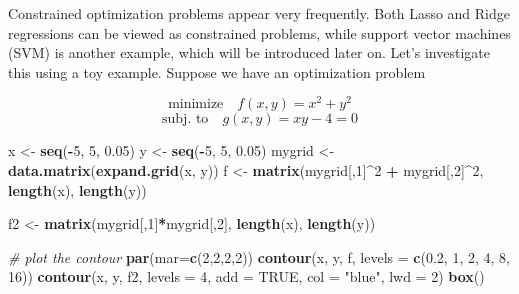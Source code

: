 \documentclass[
]{book}
\newenvironment{Shaded}{\begin{snugshade}}{\end{snugshade}}
\newcommand{\AttributeTok}[1]{\textcolor[rgb]{0.13,0.29,0.53}{#1}}
\newcommand{\CommentTok}[1]{\textcolor[rgb]{0.56,0.35,0.01}{\textit{#1}}}
\newcommand{\ConstantTok}[1]{\textcolor[rgb]{0.56,0.35,0.01}{#1}}
\newcommand{\DecValTok}[1]{\textcolor[rgb]{0.00,0.00,0.81}{#1}}
\newcommand{\FloatTok}[1]{\textcolor[rgb]{0.00,0.00,0.81}{#1}}
\newcommand{\FunctionTok}[1]{\textcolor[rgb]{0.13,0.29,0.53}{\textbf{#1}}}
\newcommand{\NormalTok}[1]{#1}
\newcommand{\OtherTok}[1]{\textcolor[rgb]{0.56,0.35,0.01}{#1}}
\newcommand{\SpecialCharTok}[1]{\textcolor[rgb]{0.81,0.36,0.00}{\textbf{#1}}}
\newcommand{\StringTok}[1]{\textcolor[rgb]{0.31,0.60,0.02}{#1}}
\theoremstyle{definition}
\theoremstyle{definition}
\theoremstyle{definition}
\theoremstyle{definition}
\theoremstyle{remark}
\begin{document}
Constrained optimization problems appear very frequently. Both Lasso and Ridge regressions can be viewed as constrained problems, while support vector machines (SVM) is another example, which will be introduced later on. Let's investigate this using a toy example. Suppose we have an optimization problem

\[\text{minimize} \quad f(x, y) = x^2 + y^2\]
\[\text{subj. to} \quad g(x, y) = xy - 4 = 0\]

\begin{Shaded}
\begin{Highlighting}[]
\NormalTok{  x }\OtherTok{\textless{}{-}} \FunctionTok{seq}\NormalTok{(}\SpecialCharTok{{-}}\DecValTok{5}\NormalTok{, }\DecValTok{5}\NormalTok{, }\FloatTok{0.05}\NormalTok{)}
\NormalTok{  y }\OtherTok{\textless{}{-}} \FunctionTok{seq}\NormalTok{(}\SpecialCharTok{{-}}\DecValTok{5}\NormalTok{, }\DecValTok{5}\NormalTok{, }\FloatTok{0.05}\NormalTok{)}
\NormalTok{  mygrid }\OtherTok{\textless{}{-}} \FunctionTok{data.matrix}\NormalTok{(}\FunctionTok{expand.grid}\NormalTok{(x, y))}
\NormalTok{  f }\OtherTok{\textless{}{-}} \FunctionTok{matrix}\NormalTok{(mygrid[,}\DecValTok{1}\NormalTok{]}\SpecialCharTok{\^{}}\DecValTok{2} \SpecialCharTok{+}\NormalTok{ mygrid[,}\DecValTok{2}\NormalTok{]}\SpecialCharTok{\^{}}\DecValTok{2}\NormalTok{, }\FunctionTok{length}\NormalTok{(x), }\FunctionTok{length}\NormalTok{(y))}

\NormalTok{  f2 }\OtherTok{\textless{}{-}} \FunctionTok{matrix}\NormalTok{(mygrid[,}\DecValTok{1}\NormalTok{]}\SpecialCharTok{*}\NormalTok{mygrid[,}\DecValTok{2}\NormalTok{], }\FunctionTok{length}\NormalTok{(x), }\FunctionTok{length}\NormalTok{(y))}
  
  \CommentTok{\# plot the contour}
  \FunctionTok{par}\NormalTok{(}\AttributeTok{mar=}\FunctionTok{c}\NormalTok{(}\DecValTok{2}\NormalTok{,}\DecValTok{2}\NormalTok{,}\DecValTok{2}\NormalTok{,}\DecValTok{2}\NormalTok{))}
  \FunctionTok{contour}\NormalTok{(x, y, f, }\AttributeTok{levels =} \FunctionTok{c}\NormalTok{(}\FloatTok{0.2}\NormalTok{, }\DecValTok{1}\NormalTok{, }\DecValTok{2}\NormalTok{, }\DecValTok{4}\NormalTok{, }\DecValTok{8}\NormalTok{, }\DecValTok{16}\NormalTok{))}
  \FunctionTok{contour}\NormalTok{(x, y, f2, }\AttributeTok{levels =} \DecValTok{4}\NormalTok{, }\AttributeTok{add =} \ConstantTok{TRUE}\NormalTok{, }\AttributeTok{col =} \StringTok{"blue"}\NormalTok{, }\AttributeTok{lwd =} \DecValTok{2}\NormalTok{)}
  \FunctionTok{box}\NormalTok{()}


\end{Highlighting}
\end{Shaded}
\end{document}
